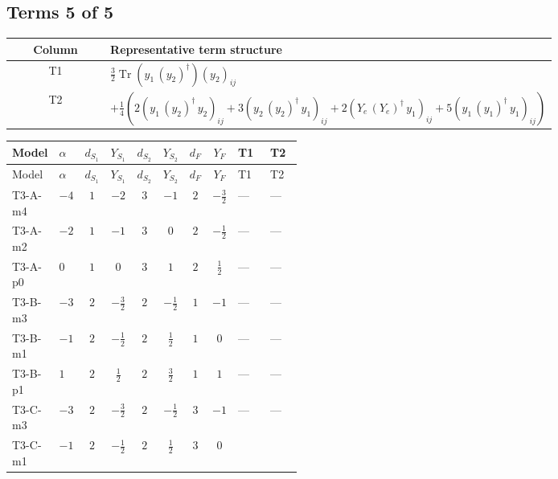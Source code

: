 \documentclass[8pt]{article}
\begin{document}
\begin{landscape}
\subsection*{Terms 5 of 5}
\begin{center}
\begin{tabular}{@{}c >{\raggedright\arraybackslash}p{0.82\linewidth}@{}}
\toprule
Column & Representative term structure \\
\midrule
T1 & \(\displaystyle \frac{3}{2} \operatorname{Tr}\!\left({y_1}\,\left({y_2}\right)^{\dagger}\right) \left({y_2}\right)_{ij}\) \\
\midrule
T2 & \(\displaystyle +\frac{1}{4} (2 \left({y_1}\,\left({y_2}\right)^{\dagger}\,{y_2}\right)_{ij}+3 \left({y_2}\,\left({y_2}\right)^{\dagger}\,{y_1}\right)_{ij}+2 \left({Y_e}\,\left({Y_e}\right)^{\dagger}\,{y_1}\right)_{ij}+5 \left({y_1}\,\left({y_1}\right)^{\dagger}\,{y_1}\right)_{ij})\) \\
\midrule
\bottomrule
\end{tabular}
\end{center}
\smallskip
\tiny
\begin{longtable}{@{}llcccccc >{\raggedright\arraybackslash}p{0.21\linewidth} >{\raggedright\arraybackslash}p{0.21\linewidth}@{}}
\toprule
Model & $\alpha$ & $d_{S_1}$ & $Y_{S_1}$ & $d_{S_2}$ & $Y_{S_2}$ & $d_F$ & $Y_F$ & T1 & T2 \\
\midrule
\endfirsthead
\toprule
Model & $\alpha$ & $d_{S_1}$ & $Y_{S_1}$ & $d_{S_2}$ & $Y_{S_2}$ & $d_F$ & $Y_F$ & T1 & T2 \\
\midrule
\endhead
T3-A-m4 & $-4$ & $1$ & $-2$ & $3$ & $-1$ & $2$ & $-\frac{3}{2}$ & --- & --- \\
\midrule
T3-A-m2 & $-2$ & $1$ & $-1$ & $3$ & $0$ & $2$ & $-\frac{1}{2}$ & --- & --- \\
\midrule
T3-A-p0 & $0$ & $1$ & $0$ & $3$ & $1$ & $2$ & $\frac{1}{2}$ & --- & --- \\
\midrule
T3-B-m3 & $-3$ & $2$ & $-\frac{3}{2}$ & $2$ & $-\frac{1}{2}$ & $1$ & $-1$ & --- & --- \\
\midrule
T3-B-m1 & $-1$ & $2$ & $-\frac{1}{2}$ & $2$ & $\frac{1}{2}$ & $1$ & $0$ & --- & --- \\
\midrule
T3-B-p1 & $1$ & $2$ & $\frac{1}{2}$ & $2$ & $\frac{3}{2}$ & $1$ & $1$ & --- & --- \\
\midrule
T3-C-m3 & $-3$ & $2$ & $-\frac{3}{2}$ & $2$ & $-\frac{1}{2}$ & $3$ & $-1$ & --- & --- \\
\midrule
T3-C-m1 & $-1$ & $2$ & $-\frac{1}{2}$ & $2$ & $\frac{1}{2}$ & $3$ & $0$ & \scriptsize\adjustbox{max width=\linewidth}{$\begin{gathered} \frac{3}{2} \operatorname{Tr}\!\left({y_1}\,\left({y_2}\right)^{\dagger}\right) \left({y_2}\right)_{ij}\end{gathered}$} & \scriptsize\adjustbox{max width=\linewidth}{$\begin{gathered} +\frac{1}{4} (2 \left({y_1}\,\left({y_2}\right)^{\dagger}\,{y_2}\right)_{ij}+3 \left({y_2}\,\left({y_2}\right)^{\dagger}\,{y_1}\right)_{ij}+2 \left({Y_e}\,\left({Y_e}\right)^{\dagger}\,{y_1}\right)_{ij}+5 \left({y_1}\,\left({y_1}\right)^{\dagger}\,{y_1}\right)_{ij})\end{gathered}$} \\

\end{longtable}
\end{landscape}
\end{document}
